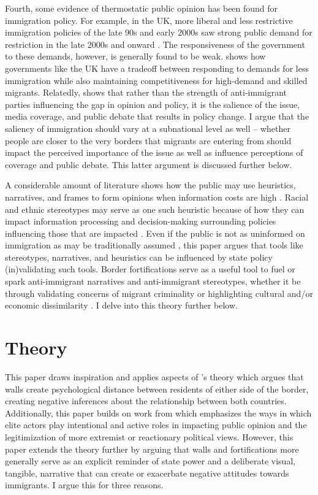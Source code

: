 \documentclass[12pt,]{article}
\begin{document}
Fourth, some evidence of thermostatic public opinion has been found for
immigration policy. For example, in the UK, more liberal and less
restrictive immigration policies of the late 90s and early 2000s saw
strong public demand for restriction in the late 2000s and onward
\citep{ford2015}. The responsiveness of the government to these demands,
however, is generally found to be weak. \citet{ford2015} shows how
governments like the UK have a tradeoff between responding to demands
for less immigration while also maintaining competitiveness for
high-demand and skilled migrants. Relatedly, \citet{morales2015} shows
that rather than the strength of anti-immigrant parties influencing the
gap in opinion and policy, it is the salience of the issue, media
coverage, and public debate that results in policy change. I argue that
the saliency of immigration should vary at a subnational level as well
-- whether people are closer to the very borders that migrants are
entering from should impact the perceived importance of the issue as
well as influence perceptions of coverage and public debate. This latter
argument is discussed further below.

A considerable amount of literature shows how the public may use
heuristics, narratives, and frames to form opinions when information
costs are high
\citep{mondak1993, rugeley2012, petersen2009, aaroe2014, culpepper2024}.
Racial and ethnic stereotypes may serve as one such heuristic because of
how they can impact information processing and decision-making
surrounding policies influencing those that are impacted
\citep{burns2000}. Even if the public is not as uninformed on
immigration as may be traditionally assumed \citep{lahav2004}, this
paper argues that tools like stereotypes, narratives, and heuristics can
be influenced by state policy (in)validating such tools. Border
fortifications serve as a useful tool to fuel or spark anti-immigrant
narratives and anti-immigrant stereotypes, whether it be through
validating concerns of migrant criminality or highlighting cultural
and/or economic dissimilarity
\citep{jaramillo-dent2021, mutz2022, carter2017}. I delve into this
theory further below.

\section{Theory}\label{theory}

This paper draws inspiration and applies aspects of \citet{mutz2022}'s
theory which argues that walls create psychological distance between
residents of either side of the border, creating negative inferences
about the relationship between both countries. Additionally, this paper
builds on work from \citet{mondon2022} which emphasizes the ways in
which elite actors play intentional and active roles in impacting public
opinion and the legitimization of more extremist or reactionary
political views. However, this paper extends the theory further by
arguing that walls and fortifications more generally serve as an
explicit reminder of state power and a deliberate visual, tangible,
narrative that can create or exacerbate negative attitudes towards
immigrants. I argue this for three reasons.
\end{document}
